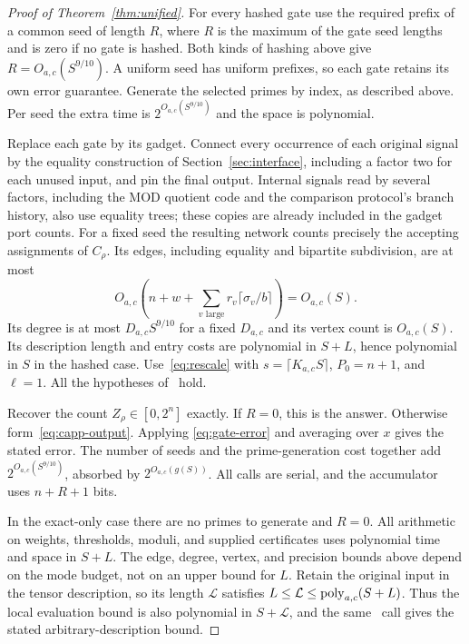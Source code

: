 \begin{proof}[Proof of Theorem~\ref{thm:unified}]
For every hashed gate use the required prefix of a common seed of
length $R$, where $R$ is the maximum of the gate seed lengths and is
zero if no gate is hashed. Both kinds of hashing above give
$R=O_{a,c}(S^{9/10})$. A uniform seed has uniform prefixes, so each
gate retains its own error guarantee. Generate the selected primes
by index, as described above. Per seed the extra time is
$2^{O_{a,c}(S^{9/10})}$ and the space is polynomial.

Replace each gate by its gadget. Connect every occurrence of each
original signal by the equality construction of
Section~\ref{sec:interface}, including a factor two for each unused
input, and pin the final output. Internal signals read by several
factors, including the MOD quotient code and the comparison protocol's
branch history, also use equality trees; these copies are already
included in the gadget port counts. For a fixed seed the resulting
network counts precisely the accepting assignments of $C_\rho$.
Its edges, including equality and bipartite subdivision, are at most
\[
 O_{a,c}\left(n+w+
 \sum_{v\text{ large}}r_v\lceil\sigma_v/b\rceil\right)=O_{a,c}(S).
\]
Its degree is at most $D_{a,c}S^{9/10}$ for a fixed $D_{a,c}$ and its
vertex count is $O_{a,c}(S)$. Its description length and entry costs
are polynomial in $S+L$, hence polynomial in $S$ in the hashed case.
Use~\eqref{eq:rescale} with $s=\lceil K_{a,c}S\rceil$,
$P_0=n+1$, and $\ell=1$. All the hypotheses of \HTC\ hold.

Recover the count $Z_\rho\in[0,2^n]$ exactly. If $R=0$, this is the
answer. Otherwise form~\eqref{eq:capp-output}. Applying
\eqref{eq:gate-error} and averaging over $x$ gives the stated error.
The number of seeds and the prime-generation cost together add
$2^{O_{a,c}(S^{9/10})}$, absorbed by $2^{O_{a,c}(g(S))}$.
All calls are serial, and the accumulator uses $n+R+1$ bits.

In the exact-only case there are no primes to generate and $R=0$.
All arithmetic on weights, thresholds, moduli, and supplied certificates
uses polynomial time and space in $S+L$. The edge, degree, vertex,
and precision bounds above depend on the mode budget, not on an upper
bound for $L$. Retain the original input in the tensor description,
so its length $\mathcal L$ satisfies
$L\le\mathcal L\le\operatorname{poly}_{a,c}(S+L)$. Thus the local evaluation
bound is also polynomial in $S+\mathcal L$, and the same \HTC\ call
gives the stated arbitrary-description bound.
\end{proof}


